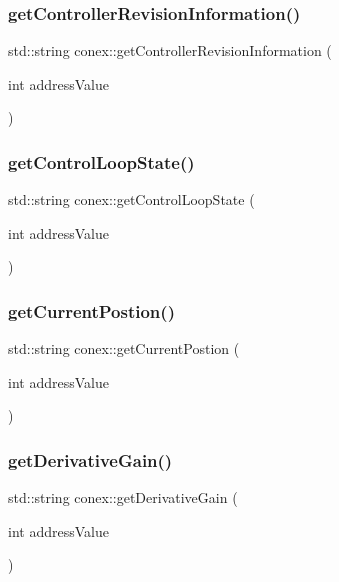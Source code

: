 \subsubsection{\texorpdfstring{get\+Controller\+Revision\+Information()}{getControllerRevisionInformation()}}
{\footnotesize\ttfamily std\+::string conex\+::get\+Controller\+Revision\+Information (\begin{DoxyParamCaption}\item[{int}]{address\+Value }\end{DoxyParamCaption})}

\mbox{\label{namespaceconex_a50aafea583b1e9883f5c9da70f84e572}} 
\subsubsection{\texorpdfstring{get\+Control\+Loop\+State()}{getControlLoopState()}}
{\footnotesize\ttfamily std\+::string conex\+::get\+Control\+Loop\+State (\begin{DoxyParamCaption}\item[{int}]{address\+Value }\end{DoxyParamCaption})}

\mbox{\label{namespaceconex_abc96926292153eb7b8268a340eb140fc}} 
\subsubsection{\texorpdfstring{get\+Current\+Postion()}{getCurrentPostion()}}
{\footnotesize\ttfamily std\+::string conex\+::get\+Current\+Postion (\begin{DoxyParamCaption}\item[{int}]{address\+Value }\end{DoxyParamCaption})}

\mbox{\label{namespaceconex_a30cba542f0ebd8eea74032431fb29d21}} 
\subsubsection{\texorpdfstring{get\+Derivative\+Gain()}{getDerivativeGain()}}
{\footnotesize\ttfamily std\+::string conex\+::get\+Derivative\+Gain (\begin{DoxyParamCaption}\item[{int}]{address\+Value }\end{DoxyParamCaption})}

